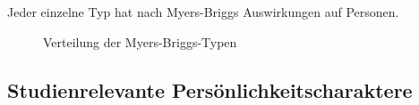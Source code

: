 Jeder einzelne Typ hat nach Myers-Briggs Auswirkungen auf Personen. \cite{myers_myers_2002} 
\begin{figure}[htbp!]
	\centering
	\caption[Verteilung der Myers-Briggs-Typen]{Verteilung der Myers-Briggs-Typen \cite{myers_myers_2002}}
	\label{img:mbti_distribution}
\end{figure}

\subsection{Studienrelevante Persönlichkeitscharaktere}
